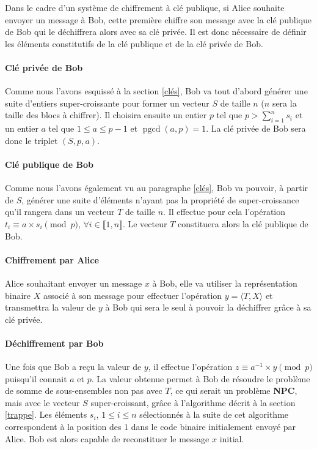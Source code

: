 \documentclass[a4paper,10pt]{article}
\newcommand{\pgcd}{\mathop{\mathrm{pgcd}}\nolimits}
\begin{document}
Dans le cadre d'un système de chiffrement à clé publique, si Alice souhaite envoyer un message à Bob, cette première chiffre son message avec la clé publique de Bob qui le déchiffrera alors avec sa clé privée. Il est donc nécessaire de définir les éléments constitutifs de la clé publique et de la clé privée de Bob.

\paragraph{Clé privée de Bob} Comme nous l'avons esquissé à la section \ref{clés}, Bob va tout d'abord générer une suite d'entiers super-croissante pour former un vecteur $S$ de taille $n$ ($n$ sera la taille des blocs à chiffrer). Il choisira ensuite un entier $p$ tel que $p > \sum \limits_{{i=1}}^{n} s_i$ et un entier $a$ tel que $1\leq a \leq p-1$ et $\pgcd(a,p) = 1$. La clé privée de Bob sera donc le triplet $(S, p, a)$.

\paragraph{Clé publique de Bob} Comme nous l'avons également vu au paragraphe \ref{clés}, Bob va pouvoir, à partir de $S$, générer une suite d'éléments n'ayant pas la propriété de super-croissance qu'il rangera dans un vecteur $T$ de taille $n$. Il effectue pour cela l'opération $t_i \equiv a \times s_i \pmod p$, $\forall i \in \llbracket 1, n \rrbracket$. Le vecteur $T$ constituera alors la clé publique de Bob.

\paragraph{Chiffrement par Alice} Alice souhaitant envoyer un message $x$ à Bob, elle va utiliser la représentation binaire $X$ associé à son message pour effectuer l'opération $y = \langle T , X\rangle$ et transmettra la valeur de $y$ à Bob qui sera le seul à pouvoir la déchiffrer grâce à sa clé privée.

\paragraph{Déchiffrement par Bob} Une fois que Bob a reçu la valeur de $y$, il effectue l'opération $z \equiv a^{-1} \times y \pmod p$ puisqu'il connait $a$ et $p$. La valeur obtenue permet à Bob de résoudre le problème de somme de sous-ensembles non pas avec $T$, ce qui serait un problème \textbf{NPC}, mais avec le vecteur $S$ super-croissant, grâce à l'algorithme décrit à la section \ref{trappe}. Les éléments $s_i$, $1\leq i\leq n$ sélectionnés à la suite de cet algorithme correspondent à la position des $1$ dans le code binaire initialement envoyé par Alice. Bob est alors capable de reconstituer le message $x$ initial.
\end{document}
